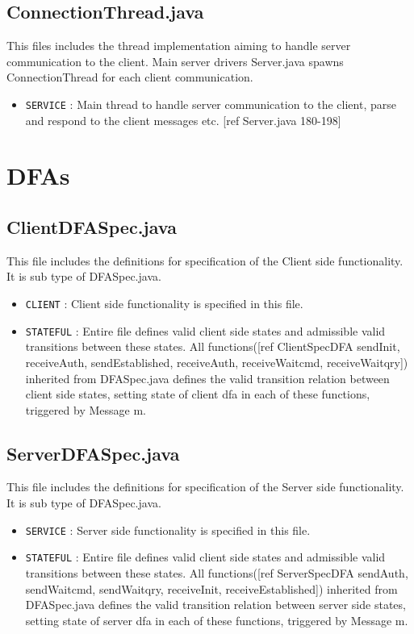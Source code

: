 \documentclass[12pt]{usenixsubmit}
\begin{document}
\subsection{ConnectionThread.java} This files includes the thread implementation aiming to handle server communication to the client. Main server drivers Server.java spawns ConnectionThread for each client communication.
\begin{itemize}
 \item {\tt SERVICE} : Main thread to handle server communication to the client, parse and respond to the client messages etc. [ref Server.java 180-198]
\end{itemize}
  
\section{DFAs}
\subsection{ClientDFASpec.java}This file includes the definitions for specification of the Client side functionality. It is sub type of DFASpec.java.
\begin{itemize}
\item  {\tt CLIENT} : Client side functionality is specified in this file.
\item {\tt STATEFUL} : Entire file defines valid client side states and admissible valid transitions between these states. All functions([ref ClientSpecDFA \textsf{sendInit}, receiveAuth, sendEstablished, receiveAuth, receiveWaitcmd, receiveWaitqry]) inherited from DFASpec.java defines the valid transition relation between client side states, setting state of client dfa in each of these functions, triggered by \textsf{Message m}. 
  \end{itemize}
\subsection{ServerDFASpec.java}This file includes the definitions for specification of the Server side functionality. It is sub type of DFASpec.java.
\begin{itemize}
  \item {\tt SERVICE} : Server side functionality is specified in this file.
  \item {\tt STATEFUL} : Entire file defines valid client side states and admissible valid transitions between these states. All functions([ref ServerSpecDFA sendAuth, sendWaitcmd, sendWaitqry, receiveInit, receiveEstablished]) inherited from DFASpec.java defines the valid transition relation between server side states, setting state of server dfa in each of these functions, triggered by \textsf{Message m}. 
  \end{itemize}
\end{document}

